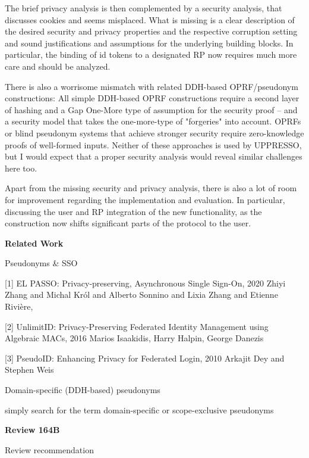 \documentclass[letterpaper,onecolumn,10pt]{article}
\begin{document}
The brief privacy analysis is then complemented by a security analysis, that discusses cookies and seems misplaced.
What is missing is a clear description of the desired security and privacy properties and the respective corruption setting and sound justifications and assumptions for the underlying building blocks. In particular, the binding of id tokens to a designated RP now requires much more care and should be analyzed.

There is also a worrisome mismatch with related DDH-based OPRF/pseudonym constructions: All simple DDH-based OPRF constructions require a second layer of hashing and a Gap One-More type of assumption for the security proof -- and a security model that takes the one-more-type of "forgeries" into account. OPRFs or blind pseudonym systems that achieve stronger security require zero-knowledge proofs of well-formed inputs. Neither of these approaches is used by UPPRESSO, but I would expect that a proper security analysis would reveal similar challenges here too.

Apart from the missing security and privacy analysis, there is also a lot of room for improvement regarding the implementation and evaluation. In particular, discussing the user and RP integration of the new functionality, as the construction now shifts significant parts of the protocol to the user.


\vspace{1mm}\noindent\textbf{Related Work}


Pseudonyms \& SSO


[1] EL PASSO: Privacy-preserving, Asynchronous Single Sign-On, 2020
Zhiyi Zhang and
               Michal Kr{\'{o}}l and
               Alberto Sonnino and
               Lixia Zhang and
               Etienne Rivi{\`{e}}re,

[2] UnlimitID: Privacy-Preserving Federated Identity Management using Algebraic MACs, 2016
Marios Isaakidis, Harry Halpin, George Danezis

[3] PseudoID: Enhancing Privacy for Federated Login, 2010
Arkajit Dey and Stephen Weis

Domain-specific (DDH-based) pseudonyms


simply search for the term domain-specific or scope-exclusive pseudonyms




\vspace{1mm}\noindent\textbf{Review 164B}


Review recommendation
\end{document}
